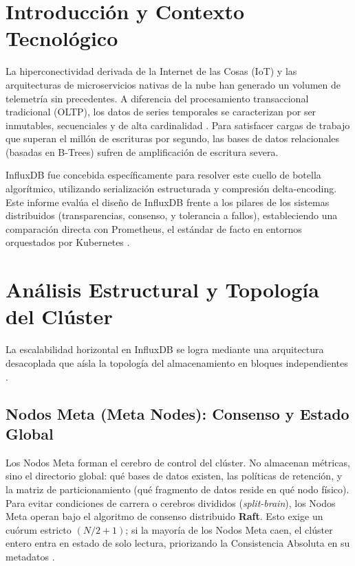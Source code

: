 \documentclass[12pt,a4paper]{article}
\begin{document}
\section{Introducción y Contexto Tecnológico}
La hiperconectividad derivada de la Internet de las Cosas (IoT) y las arquitecturas de microservicios nativas de la nube han generado un volumen de telemetría sin precedentes. A diferencia del procesamiento transaccional tradicional (OLTP), los datos de series temporales se caracterizan por ser inmutables, secuenciales y de alta cardinalidad \cite{kopp2025}. Para satisfacer cargas de trabajo que superan el millón de escrituras por segundo, las bases de datos relacionales (basadas en B-Trees) sufren de amplificación de escritura severa. 

InfluxDB fue concebida específicamente para resolver este cuello de botella algorítmico, utilizando serialización estructurada y compresión delta-encoding. Este informe evalúa el diseño de InfluxDB frente a los pilares de los sistemas distribuidos (transparencias, consenso, y tolerancia a fallos), estableciendo una comparación directa con Prometheus, el estándar de facto en entornos orquestados por Kubernetes \cite{ntop2023}.

\section{Análisis Estructural y Topología del Clúster}
La escalabilidad horizontal en InfluxDB se logra mediante una arquitectura desacoplada que aísla la topología del almacenamiento en bloques independientes \cite{ford2021}.

\subsection{Nodos Meta (Meta Nodes): Consenso y Estado Global}
Los Nodos Meta forman el cerebro de control del clúster. No almacenan métricas, sino el directorio global: qué bases de datos existen, las políticas de retención, y la matriz de particionamiento (qué fragmento de datos reside en qué nodo físico). Para evitar condiciones de carrera o cerebros divididos (\textit{split-brain}), los Nodos Meta operan bajo el algoritmo de consenso distribuido \textbf{Raft}. Esto exige un cuórum estricto $(N/2 + 1)$; si la mayoría de los Nodos Meta caen, el clúster entero entra en estado de solo lectura, priorizando la Consistencia Absoluta en su metadatos \cite{energy2024}.
\end{document}
